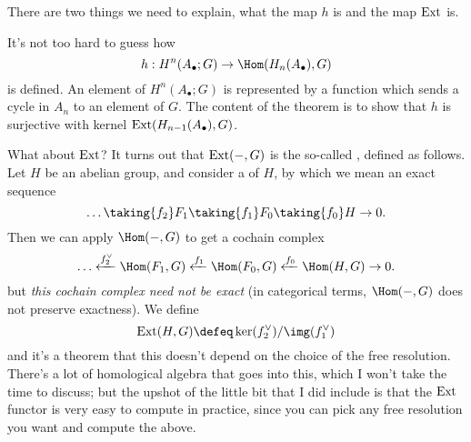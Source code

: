 There are two things we need to explain, what the map $h$ is and the map $\operatorname{Ext}$ is.

It's not too hard to guess how \[ h : H^n(A_\bullet; G) \to \Hom(H_n(A_\bullet), G) \] is defined.
An element of $H^n(A_\bullet;G)$ is represented by a function which sends a cycle
in $A_n$ to an element of $G$.
The content of the theorem is to show that $h$ is surjective with kernel $\operatorname{Ext}(H_{n-1}(A_\bullet), G)$.

What about $\operatorname{Ext}$?
It turns out that $\operatorname{Ext}(-,G)$ is the so-called , defined as follows.
Let $H$ be an abelian group, and consider a  of $H$,
by which we mean an exact sequence
\[ \dots \taking{f_2} F_1 \taking{f_1} F_0 \taking{f_0} H \to 0. \]
Then we can apply $\Hom(-,G)$ to get a cochain complex
\[ \dots \xleftarrow{f_2^\vee} \Hom(F_1, G) \xleftarrow{f_1}
	\Hom(F_0, G) \xleftarrow{f_0} \Hom(H,G) \to 0. \]
but \emph{this cochain complex need not be exact}
(in categorical terms, $\Hom(-,G)$ does not preserve exactness).
We define \[ \Ext(H,G) \defeq \ker(f_2^\vee) / \img(f_1^\vee) \]
and it's a theorem that this doesn't depend on the choice of the free resolution.
There's a lot of homological algebra that goes into this,
which I won't take the time to discuss;
but the upshot of the little bit that I did include is that the $\operatorname{Ext}$
functor is very easy to compute in practice, since
you can pick any free resolution you want and compute the above.


